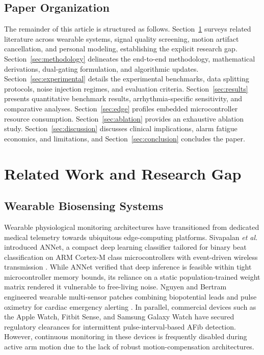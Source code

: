 \documentclass{ieeeaccess}
\begin{document}
\subsection{Paper Organization}
The remainder of this article is structured as follows. Section~\ref{sec:relatedwork} surveys related literature across wearable systems, signal quality screening, motion artifact cancellation, and personal modeling, establishing the explicit research gap. Section~\ref{sec:methodology} delineates the end-to-end methodology, mathematical derivations, dual-gating formulation, and algorithmic updates. Section~\ref{sec:experimental} details the experimental benchmarks, data splitting protocols, noise injection regimes, and evaluation criteria. Section~\ref{sec:results} presents quantitative benchmark results, arrhythmia-specific sensitivity, and comparative analyses. Section~\ref{sec:edge} profiles embedded microcontroller resource consumption. Section~\ref{sec:ablation} provides an exhaustive ablation study. Section~\ref{sec:discussion} discusses clinical implications, alarm fatigue economics, and limitations, and Section~\ref{sec:conclusion} concludes the paper.

\section{Related Work and Research Gap}
\label{sec:relatedwork}

\subsection{Wearable Biosensing Systems}
Wearable physiological monitoring architectures have transitioned from dedicated medical telemetry towards ubiquitous edge-computing platforms. Sivapalan \textit{et al.} introduced ANNet, a compact deep learning classifier tailored for binary beat classification on ARM Cortex-M class microcontrollers with event-driven wireless transmission \cite{ref:annet}. While ANNet verified that deep inference is feasible within tight microcontroller memory bounds, its reliance on a static population-trained weight matrix rendered it vulnerable to free-living noise. Nguyen and Bertram engineered wearable multi-sensor patches combining biopotential leads and pulse oximetry for cardiac emergency alerting \cite{ref:helpwear}. In parallel, commercial devices such as the Apple Watch, Fitbit Sense, and Samsung Galaxy Watch have secured regulatory clearances for intermittent pulse-interval-based AFib detection. However, continuous monitoring in these devices is frequently disabled during active arm motion due to the lack of robust motion-compensation architectures.
\end{document}
